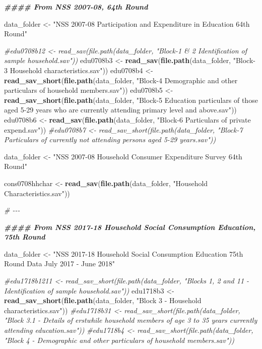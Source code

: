 \documentclass[
]{article}
\newenvironment{Shaded}{\begin{snugshade}}{\end{snugshade}}
\newcommand{\CommentTok}[1]{\textcolor[rgb]{0.56,0.35,0.01}{\textit{#1}}}
\newcommand{\DocumentationTok}[1]{\textcolor[rgb]{0.56,0.35,0.01}{\textbf{\textit{#1}}}}
\newcommand{\FunctionTok}[1]{\textcolor[rgb]{0.13,0.29,0.53}{\textbf{#1}}}
\newcommand{\NormalTok}[1]{#1}
\newcommand{\OtherTok}[1]{\textcolor[rgb]{0.56,0.35,0.01}{#1}}
\newcommand{\StringTok}[1]{\textcolor[rgb]{0.31,0.60,0.02}{#1}}
\begin{document}
\begin{Shaded}
\begin{Highlighting}[]
\DocumentationTok{\#\#\#\# From NSS 2007{-}08, 64th Round}

\NormalTok{data\_folder }\OtherTok{\textless{}{-}} \StringTok{"NSS 2007{-}08 Participation and Expenditure in Education 64th Round"}

\CommentTok{\#edu0708b12 \textless{}{-} read\_sav(file.path(data\_folder, "Block{-}1 \& 2 Identification of sample household.sav"))}
\NormalTok{edu0708b3  }\OtherTok{\textless{}{-}} \FunctionTok{read\_sav}\NormalTok{(}\FunctionTok{file.path}\NormalTok{(data\_folder, }\StringTok{"Block{-}3  Household  characteristics.sav"}\NormalTok{))}
\NormalTok{edu0708b4  }\OtherTok{\textless{}{-}} \FunctionTok{read\_sav\_short}\NormalTok{(}\FunctionTok{file.path}\NormalTok{(data\_folder, }\StringTok{"Block{-}4  Demographic and other particulars of household members.sav"}\NormalTok{))}
\NormalTok{edu0708b5  }\OtherTok{\textless{}{-}} \FunctionTok{read\_sav\_short}\NormalTok{(}\FunctionTok{file.path}\NormalTok{(data\_folder, }\StringTok{"Block{-}5  Education particulars of those aged 5{-}29 years who are currently attending primary level and above.sav"}\NormalTok{))}
\NormalTok{edu0708b6  }\OtherTok{\textless{}{-}} \FunctionTok{read\_sav}\NormalTok{(}\FunctionTok{file.path}\NormalTok{(data\_folder, }\StringTok{"Block{-}6  Particulars of private expend.sav"}\NormalTok{))}
\CommentTok{\#edu0708b7  \textless{}{-} read\_sav\_short(file.path(data\_folder, "Block{-}7  Particulars of currently not attending persons aged 5{-}29 years.sav"))}



\NormalTok{data\_folder }\OtherTok{\textless{}{-}} \StringTok{"NSS 2007{-}08 Household Consumer Expenditure Survey 64th Round"}

\NormalTok{cons0708hhchar }\OtherTok{\textless{}{-}} \FunctionTok{read\_sav}\NormalTok{(}\FunctionTok{file.path}\NormalTok{(data\_folder, }\StringTok{"Household Characteristics.sav"}\NormalTok{))}


\CommentTok{\# {-}{-}{-}}


\DocumentationTok{\#\#\#\# From NSS 2017{-}18 Household Social Consumption Education, 75th Round}

\NormalTok{data\_folder }\OtherTok{\textless{}{-}} \StringTok{"NSS 2017{-}18 Household Social Consumption Education 75th Round Data July 2017 {-} June 2018"}

\CommentTok{\#edu1718b1211 \textless{}{-} read\_sav\_short(file.path(data\_folder, "Blocks 1, 2 and 11 {-} Identification of sample household.sav"))}
\NormalTok{edu1718b3  }\OtherTok{\textless{}{-}} \FunctionTok{read\_sav\_short}\NormalTok{(}\FunctionTok{file.path}\NormalTok{(data\_folder, }\StringTok{"Block 3 {-} Household characteristics.sav"}\NormalTok{))}
\CommentTok{\#edu1718b31  \textless{}{-} read\_sav\_short(file.path(data\_folder, "Block 3.1 {-} Details of erstwhile household members of age 3 to 35 years currently attending education.sav"))}
\CommentTok{\#edu1718b4  \textless{}{-} read\_sav\_short(file.path(data\_folder, "Block 4 {-} Demographic and other particulars of household members.sav"))}


\end{Highlighting}
\end{Shaded}
\end{document}
